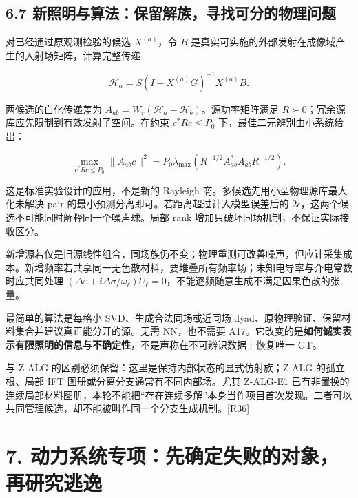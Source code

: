 \documentclass[11pt,a4paper]{article}
\begin{document}
\hypertarget{ux65b0ux7167ux660eux4e0eux7b97ux6cd5ux4fddux7559ux89e3ux65cfux5bfbux627eux53efux5206ux7684ux7269ux7406ux95eeux9898}{%
\subsection{6.7
新照明与算法：保留解族，寻找可分的物理问题}\label{ux65b0ux7167ux660eux4e0eux7b97ux6cd5ux4fddux7559ux89e3ux65cfux5bfbux627eux53efux5206ux7684ux7269ux7406ux95eeux9898}}

对已经通过原观测检验的候选 \(X^{(a)}\)，令 \(B\)
是真实可实施的外部发射在成像域产生的入射场矩阵，计算完整传递

\[
\mathcal H_a=S(I-X^{(a)}G)^{-1}X^{(a)}B.
\]

两候选的白化传递差为
\(A_{ab}=W_r(\mathcal H_a-\mathcal H_b)\)。源功率矩阵满足
\(R\succ0\)；冗余源库应先限制到有效发射子空间。在约束 \(c^*Rc\le P_0\)
下，最佳二元辨别由小系统给出：

\[
\max_{c^*Rc\le P_0}\|A_{ab}c\|^2
=P_0\lambda_{\max}(R^{-1/2}A_{ab}^*A_{ab}R^{-1/2}).
\]

这是标准实验设计的应用，不是新的 Rayleigh
商。多候选先用小型物理源库最大化未解决 pair
的最小预测分离即可。若距离超过计入模型误差后的
\(2\epsilon\)，这两个候选不可能同时解释同一个噪声球。局部 rank
增加只破坏同场机制，不保证实际接收区分。

新增源若仅是旧源线性组合，同场族仍不变；物理重测可改善噪声，但应计采集成本。新增频率若共享同一无色散材料，要堆叠所有频率场；未知电导率与介电常数时应共同处理
\((\Delta\varepsilon+i\Delta\sigma/\omega_\ell)U_\ell=0\)，不能逐频随意生成不满足因果色散的张量。

最简单的算法是每格小 SVD、生成合法同场或近同场
dyad、原物理验证、保留材料集合并建议真正能分开的源。无需 NN，也不需要
A17。它改变的是\textbf{如何诚实表示有限照明的信息与不确定性}，不是声称在不可辨识数据上恢复唯一
GT。

与 Z-ALG 的区别必须保留：这里是保持内部状态的显式仿射族；Z-ALG
的孤立根、局部 IFT 图册或分离分支通常有不同内部场。尤其 Z-ALG-E1
已有非置换的连续局部材料图册，本轮不能把``存在连续多解''本身当作项目首次发现。二者可以共同管理候选，却不能被叫作同一个分支生成机制。{[}R36{]}

\hypertarget{ux52a8ux529bux7cfbux7edfux4e13ux9879ux5148ux786eux5b9aux5931ux8d25ux7684ux5bf9ux8c61ux518dux7814ux7a76ux9003ux9038}{%
\section{7.
动力系统专项：先确定失败的对象，再研究逃逸}\label{ux52a8ux529bux7cfbux7edfux4e13ux9879ux5148ux786eux5b9aux5931ux8d25ux7684ux5bf9ux8c61ux518dux7814ux7a76ux9003ux9038}}
\end{document}
